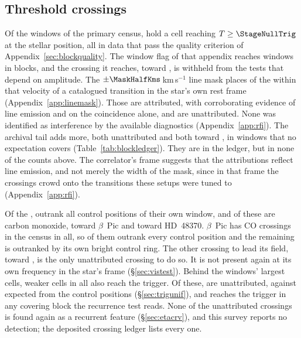 \subsection{Threshold crossings}
\label{sec:technosearch}

Of the \NWindows{} windows of the primary census, \CsNCross{} hold a cell
reaching $T\geq\StageNullTrig$ at the stellar position, all in data that pass
the quality criterion of Appendix~\ref{sec:blockquality}. The window flag of
that appendix reaches \DqNWin{} windows in \BkFlagNBlock{} blocks, and the
\BkFlagNCrossOtherWord{} crossing it reaches, toward \BkFlagOtherStar, is
withheld from the tests that depend on amplitude. The
$\pm\MaskHalfKms$\,km\,s$^{-1}$ line mask places \MkNCoinc{} of the
\CsNCrossQp{} within that velocity of a catalogued transition in the star's
own rest frame (Appendix~\ref{app:linemask}). Those \CsNAttrQp{} are
attributed, \LnAttrSupp{} with corroborating evidence of line emission and
\LnAttrCoinc{} on the coincidence alone, and \CsNUnattrQp{} are
unattributed. None was identified as interference by the available
diagnostics (Appendix~\ref{app:rfi}). The archival tail adds
\CeNTailCrossWord{} more, both unattributed and both toward \CeTailStar, in
windows that no expectation covers (Table~\ref{tab:blockledger}). They are in
the ledger, but in none of the counts above. The correlator's frame
suggests that the attributions reflect line emission, and not merely the
width of the mask, since in that frame the crossings crowd onto the
transitions these setups were tuned to (Appendix~\ref{app:rfi}).

Of the \CsNCrossQp, \LrStageN{} outrank all \NCtrl{} control positions of
their own window, and \LrStageNCo{} of these are carbon monoxide,
\JqNBpCoWord{} toward $\beta$~Pic and \JqNHdCoWord{} toward HD~48370.
$\beta$~Pic has \BpicPanelNCo{} CO crossings in the census in all, so
\JqNBpCoWord{} of them outrank every control position and the remaining
\JqNBpCoOutWord{} is outranked by its own bright control ring. The
other crossing to lead its field, toward \EvAStar, is the only unattributed
crossing to do so. It is not present again at its own frequency in the
star's frame (\S\ref{sec:vistest}). Behind the
windows' largest cells, \CkNSecondaryWord{} weaker cells in all also reach the
trigger. Of these, \CkNSecUnattrWord{} are unattributed, against \AcSecExp{}
expected from the control positions (\S\ref{sec:trigunif}), and \CkNRecurWord{} reaches the
trigger in any covering block the recurrence test reads. None of the unattributed
crossings is found again as a recurrent feature (\S\ref{sec:etacrv}), and
this survey reports no detection; the deposited crossing ledger lists every
one.

